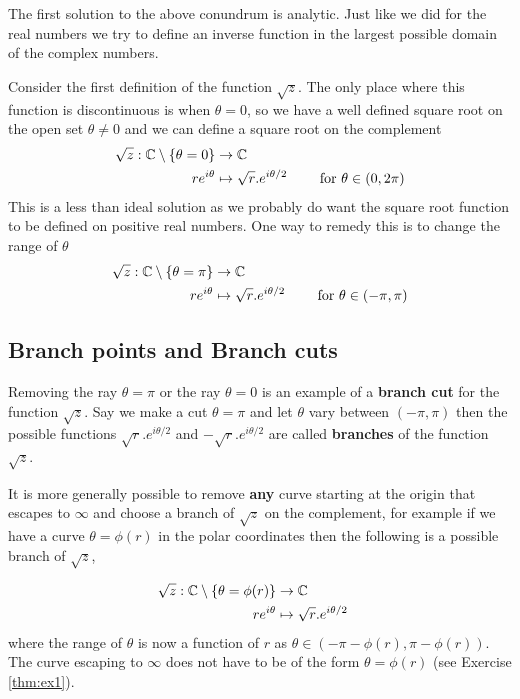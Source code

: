 The first solution to the above conundrum is analytic. Just like we did for the real numbers we try to define an inverse function in the largest possible domain of the complex numbers.

Consider the first definition of the function $\sqrt{z}$. The only place where this function is discontinuous is when $\theta = 0$, so we have a well defined square root on the open set $\theta \neq 0$ and we can define a square root on the complement
\begin{align}
	\sqrt{z} : \mathbb{C} \setminus \{ \theta = 0\} & \rightarrow \mathbb{C}                  \\
	r e^{i \theta}                          & \mapsto \sqrt{r}.e^{i \theta/2}
	\qquad \mbox{ for } \theta \in (0,2\pi)
\end{align}
This is a less than ideal solution as we probably do want the square root function to be defined on positive real numbers. One way to remedy this is to change the range of $\theta$
\begin{align}
	\sqrt{z} : \mathbb{C} \setminus \{ \theta = \pi\} & \rightarrow \mathbb{C}                                                            \\
	r e^{i \theta}                            & \mapsto \sqrt{r}.e^{i \theta/2} \qquad \mbox{ for } \theta \in (-\pi,\pi)
\end{align}


\subsection{Branch points and Branch cuts}
\begin{definition}
	Removing the ray $\theta = \pi$ or the ray $\theta = 0$ is an example of a \textbf{branch cut} for the function $\sqrt{z}$. Say we make a cut $\theta = \pi$ and let $\theta$ vary between $(-\pi, \pi)$ then the possible functions $\sqrt{r}.e^{i \theta/2}$ and $-\sqrt{r}.e^{i \theta/2}$ are called \textbf{branches} of the function $\sqrt{z}$.
\end{definition}
It is more generally possible to remove \textbf{any} curve starting at the origin that escapes to $\infty$ and choose a branch of $\sqrt{z}$ on the complement, for example if we have a curve $\theta = \phi(r)$ in the polar coordinates then the following is a possible branch of $\sqrt{z}$,

\begin{align}
	\sqrt{z} : \mathbb{C} \setminus \{ \theta = \phi(r)\} & \rightarrow \mathbb{C}                                                     \\
	r e^{i \theta} & \mapsto \sqrt{r}.e^{i \theta/2} &
\end{align}
where the range of $\theta$ is now a function of $r$ as $\theta \in (-\pi - \phi(r),\pi - \phi(r))$. The curve escaping to $\infty$ does not have to be of the form $\theta = \phi(r)$ (see Exercise \ref{thm:ex1}).

